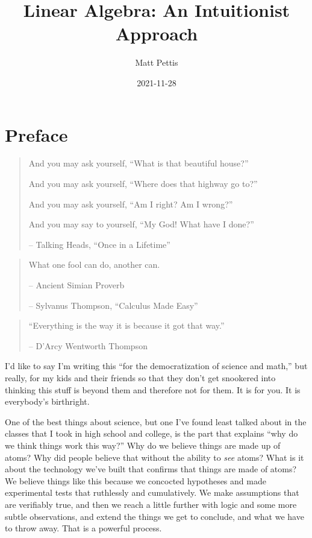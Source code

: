 \documentclass[
]{book}
\title{Linear Algebra: An Intuitionist Approach}
\author{Matt Pettis}
\date{2021-11-28}
\begin{document}
\maketitle

{
\setcounter{tocdepth}{1}
\tableofcontents
}
\hypertarget{preface}{%
\chapter{Preface}\label{preface}}

\begin{quote}
And you may ask yourself, ``What is that beautiful house?''

And you may ask yourself, ``Where does that highway go to?''

And you may ask yourself, ``Am I right? Am I wrong?''

And you may say to yourself, ``My God! What have I done?''

-- Talking Heads, ``Once in a Lifetime''
\end{quote}

\begin{quote}
What one fool can do, another can.

-- Ancient Simian Proverb

-- Sylvanus Thompson, ``Calculus Made Easy''
\end{quote}

\begin{quote}
``Everything is the way it is because it got that way.''

-- D'Arcy Wentworth Thompson
\end{quote}

I'd like to say I'm writing this ``for the democratization of science and math,'' but really, for my kids and their friends so that they don't get snookered into thinking this stuff is beyond them and therefore not for them. It is for you. It is everybody's birthright.

One of the best things about science, but one I've found least talked about in the classes that I took in high school and college, is the part that explains ``why do we think things work this way?'' Why do we believe things are made up of atoms? Why did people believe that without the ability to \emph{see} atoms? What is it about the technology we've built that confirms that things are made of atoms? We believe things like this because we concocted hypotheses and made experimental tests that ruthlessly and cumulatively. We make assumptions that are verifiably true, and then we reach a little further with logic and some more subtle observations, and extend the things we get to conclude, and what we have to throw away. That is a powerful process.
\end{document}
